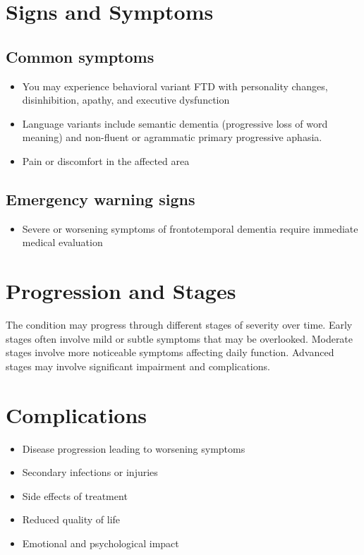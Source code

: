 \section{Signs and Symptoms}

\subsection{Common symptoms}
\begin{itemize}[noitemsep]
  \item You may experience behavioral variant FTD with personality changes, disinhibition, apathy, and executive dysfunction
  \item Language variants include semantic dementia (progressive loss of word meaning) and non-fluent or agrammatic primary progressive aphasia.
  \item Pain or discomfort in the affected area
  \end{itemize}

\subsection{Emergency warning signs}
\begin{itemize}[noitemsep]
  \item Severe or worsening symptoms of frontotemporal dementia require immediate medical evaluation
\end{itemize}
\section{Progression and Stages}
The condition may progress through different stages of severity over time. Early stages often involve mild or subtle symptoms that may be overlooked. Moderate stages involve more noticeable symptoms affecting daily function. Advanced stages may involve significant impairment and complications.
\section{Complications}
\begin{itemize}[noitemsep]
  \item Disease progression leading to worsening symptoms
  \item Secondary infections or injuries
  \item Side effects of treatment
  \item Reduced quality of life
  \item Emotional and psychological impact
\end{itemize}
